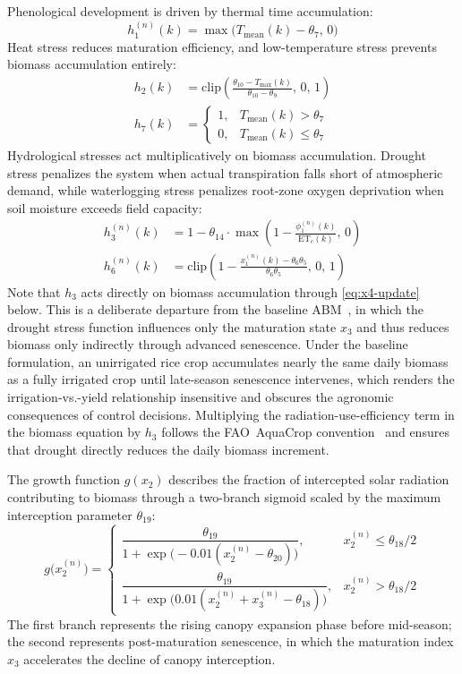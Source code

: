 Phenological development is driven by thermal time accumulation:
\begin{equation}
h_1^{(n)}(k) = \max\bigl(T_{\mathrm{mean}}(k) - \theta_7,\, 0\bigr)
\label{eq:h1}
\end{equation}
Heat stress reduces maturation efficiency, and low-temperature stress
prevents biomass accumulation entirely:
\begin{align}
h_2(k) &= \mathrm{clip}\!\left(
\frac{\theta_{10} - T_{\max}(k)}{\theta_{10} - \theta_9},\, 0,\, 1
\right)
\label{eq:h2}\\
h_7(k) &=
\begin{cases}
1, & T_{\mathrm{mean}}(k) > \theta_7 \\
0, & T_{\mathrm{mean}}(k) \leq \theta_7
\end{cases}
\label{eq:h7}
\end{align}
Hydrological stresses act multiplicatively on biomass accumulation.
Drought stress penalizes the system when actual transpiration falls
short of atmospheric demand, while waterlogging stress penalizes
root-zone oxygen deprivation when soil moisture exceeds field
capacity:
\begin{align}
h_3^{(n)}(k) &= 1 - \theta_{14} \cdot
\max\!\left(1 - \frac{\phi_1^{(n)}(k)}{\mathrm{ET}_c(k)},\, 0\right)
\label{eq:h3}\\
h_6^{(n)}(k) &= \mathrm{clip}\!\left(
1 - \frac{x_1^{(n)}(k) - \theta_6 \theta_5}{\theta_6 \theta_5},\,
0,\, 1
\right)
\label{eq:h6}
\end{align}
Note that $h_3$ acts directly on biomass accumulation through
\eqref{eq:x4-update} below. This is a deliberate departure from the
baseline ABM~\cite{Lopezjimenez2024}, in which the drought stress
function influences only the maturation state $x_3$ and thus reduces
biomass only indirectly through advanced senescence. Under the
baseline formulation, an unirrigated rice crop accumulates nearly the
same daily biomass as a fully irrigated crop until late-season
senescence intervenes, which renders the irrigation-vs.-yield
relationship insensitive and obscures the agronomic consequences of
control decisions. Multiplying the radiation-use-efficiency term in
the biomass equation by $h_3$ follows the FAO~AquaCrop
convention~\cite{allen1998} and ensures that drought directly reduces
the daily biomass increment.

The growth function $g(x_2)$ describes the fraction of intercepted
solar radiation contributing to biomass through a two-branch sigmoid
scaled by the maximum interception parameter $\theta_{19}$:
\begin{equation}
g\bigl(x_2^{(n)}\bigr) =
\begin{cases}
\dfrac{\theta_{19}}{1 + \exp\!\bigl(-0.01(x_2^{(n)} - \theta_{20})\bigr)},
& x_2^{(n)} \leq \theta_{18}/2 \\[1.0em]
\dfrac{\theta_{19}}{1 + \exp\!\bigl( 0.01(x_2^{(n)} + x_3^{(n)} - \theta_{18})\bigr)},
& x_2^{(n)} > \theta_{18}/2
\end{cases}
\label{eq:g}
\end{equation}
The first branch represents the rising canopy expansion phase before
mid-season; the second represents post-maturation senescence, in which
the maturation index $x_3$ accelerates the decline of canopy
interception.

